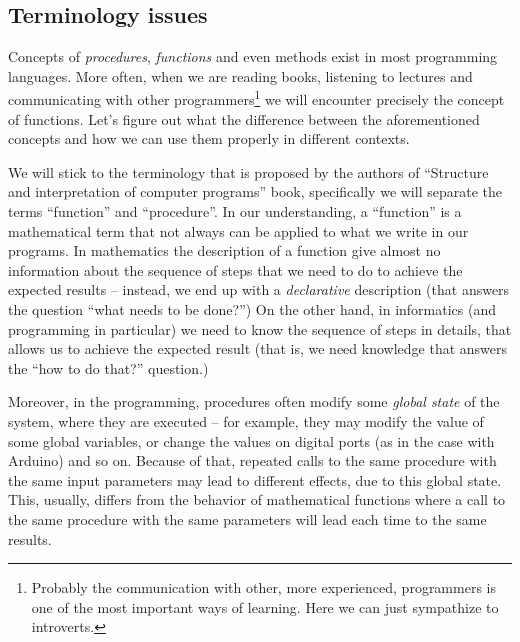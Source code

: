 \documentclass[../sparc.tex]{subfiles}
\begin{document}
\subsection{Terminology issues}

Concepts of \emph{procedures}, \emph{functions} and even methods exist in most
programming languages.  More often, when we are reading books, listening to
lectures and communicating with other programmers\footnote{Probably the
communication with other, more experienced, programmers is one of the most
important ways of learning.  Here we can just sympathize to introverts.} we will
encounter precisely the concept of functions.  Let's figure out what the
difference between the aforementioned concepts and how we can use them properly
in different contexts.

We will stick to the terminology that is proposed\cite[28]{sicp-en} by the
authors of ``Structure and interpretation of computer programs'' book,
specifically we will separate the terms ``function'' and ``procedure''.  In our
understanding, a ``function'' is a mathematical term that not always can be
applied to what we write in our programs.  In mathematics the description of a
function give almost no information about the sequence of steps that we need to
do to achieve the expected results -- instead, we end up with a
\emph{declarative} description (that answers the question ``what needs to be
done?'')  On the other hand, in informatics (and programming in particular) we
need to know the sequence of steps in details, that allows us to achieve the
expected result (that is, we need knowledge that answers the ``how to do that?''
question.)

Moreover, in the programming, procedures often modify some \emph{global state}
of the system, where they are executed -- for example, they may modify the value
of some global variables, or change the values on digital ports (as in the case
with Arduino) and so on.  Because of that, repeated calls to the same procedure
with the same input parameters may lead to different effects, due to this global
state.  This, usually, differs from the behavior of mathematical functions where
a call to the same procedure with the same parameters will lead each time to the
same results.
\end{document}
